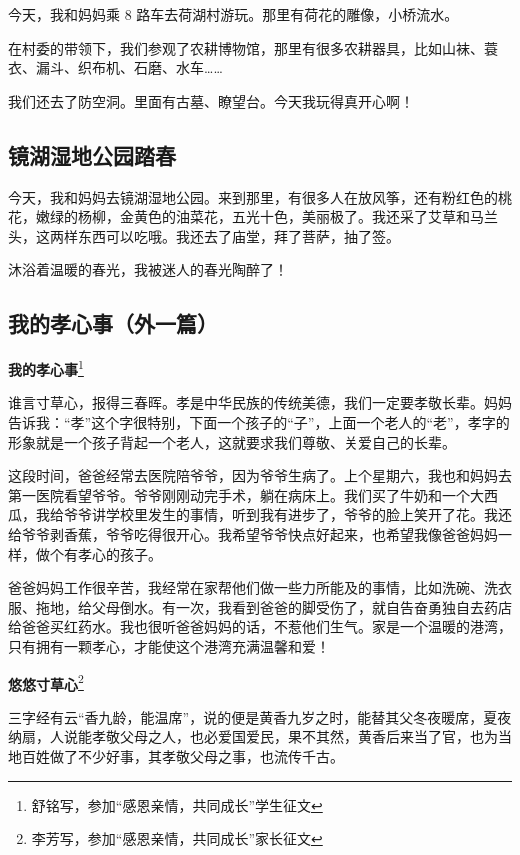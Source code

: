 \documentclass[UTF8,a4paper,titlepage,twoside,10.5pt]{article}
\begin{document}
今天，我和妈妈乘 8 路车去荷湖村游玩。那里有荷花的雕像，小桥流水。

在村委的带领下，我们参观了农耕博物馆，那里有很多农耕器具，比如山袜、蓑衣、漏斗、织布机、石磨、水车……

我们还去了防空洞。里面有古墓、瞭望台。今天我玩得真开心啊！

\subsection{镜湖湿地公园踏春}
\label{sec:org1b5c6bb}

今天，我和妈妈去镜湖湿地公园。来到那里，有很多人在放风筝，还有粉红色的桃花，嫩绿的杨柳，金黄色的油菜花，五光十色，美丽极了。我还采了艾草和马兰头，这两样东西可以吃哦。我还去了庙堂，拜了菩萨，抽了签。

沐浴着温暖的春光，我被迷人的春光陶醉了！

\subsection{我的孝心事（外一篇）}
\label{sec:orgf0afa0a}

\textbf{我的孝心事}\footnote{舒铭写，参加“感恩亲情，共同成长”学生征文}

谁言寸草心，报得三春晖。孝是中华民族的传统美德，我们一定要孝敬长辈。妈妈告诉我：“孝”这个字很特别，下面一个孩子的“子”，上面一个老人的“老”，孝字的形象就是一个孩子背起一个老人，这就要求我们尊敬、关爱自己的长辈。

这段时间，爸爸经常去医院陪爷爷，因为爷爷生病了。上个星期六，我也和妈妈去第一医院看望爷爷。爷爷刚刚动完手术，躺在病床上。我们买了牛奶和一个大西瓜，我给爷爷讲学校里发生的事情，听到我有进步了，爷爷的脸上笑开了花。我还给爷爷剥香蕉，爷爷吃得很开心。我希望爷爷快点好起来，也希望我像爸爸妈妈一样，做个有孝心的孩子。

爸爸妈妈工作很辛苦，我经常在家帮他们做一些力所能及的事情，比如洗碗、洗衣服、拖地，给父母倒水。有一次，我看到爸爸的脚受伤了，就自告奋勇独自去药店给爸爸买红药水。我也很听爸爸妈妈的话，不惹他们生气。家是一个温暖的港湾，只有拥有一颗孝心，才能使这个港湾充满温馨和爱！

\vspace*{\baselineskip}

\textbf{悠悠寸草心}\footnote{李芳写，参加“感恩亲情，共同成长”家长征文}

三字经有云“香九龄，能温席”，说的便是黄香九岁之时，能替其父冬夜暖席，夏夜纳扇，人说能孝敬父母之人，也必爱国爱民，果不其然，黄香后来当了官，也为当地百姓做了不少好事，其孝敬父母之事，也流传千古。
\end{document}
